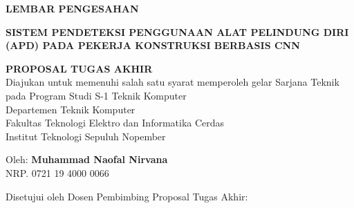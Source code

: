 
\begin{center}
  \large
  \textbf{LEMBAR PENGESAHAN}
\end{center}

\thispagestyle{empty}

\begin{center}
  \textbf{SISTEM PENDETEKSI PENGGUNAAN ALAT PELINDUNG DIRI (APD) PADA PEKERJA KONSTRUKSI BERBASIS CNN}
\end{center}

\begingroup
\small

\begin{center}
  \textbf{PROPOSAL TUGAS AKHIR} \\
  Diajukan untuk memenuhi salah satu syarat memperoleh gelar
  Sarjana Teknik pada
  Program Studi S-1 Teknik Komputer \\
  Departemen Teknik Komputer \\
  Fakultas Teknologi Elektro dan Informatika Cerdas \\
  Institut Teknologi Sepuluh Nopember
\end{center}

\begin{center}
  Oleh: \textbf{Muhammad Naofal Nirvana} \\
  NRP. 0721 19 4000 0066
\end{center}

\begin{center}
  Disetujui oleh Dosen Pembimbing Proposal Tugas Akhir:
\end{center}

\begingroup
\setlength{\tabcolsep}{0pt}

